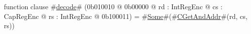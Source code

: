 function clause #\hyperref[zdecode]{decode}# (0b010010 @ 0b00000 @ rd : IntRegEnc @ cs : CapRegEnc @ rs : IntRegEnc @ 0b100011) = #\hyperref[zSome]{Some}#(#\hyperref[zCGetAndAddr]{CGetAndAddr}#(rd, cs, rs))
